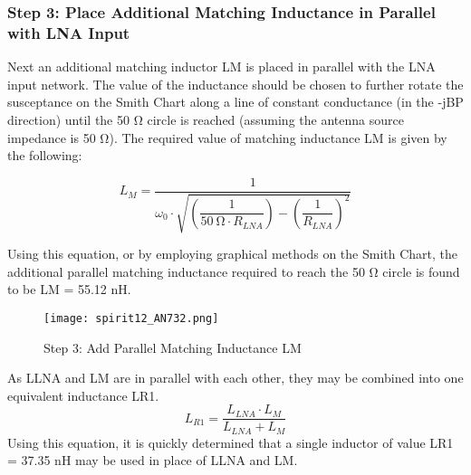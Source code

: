       \subsubsection{Step 3: Place Additional Matching Inductance in Parallel with LNA Input}
        Next an additional matching inductor LM is placed in parallel with the LNA input network. 
        The value of the inductance should be chosen to further rotate the susceptance on the Smith 
        Chart along a line of constant conductance (in the -jBP direction) until the 50 Ω circle is 
        reached (assuming the antenna source impedance is 50 Ω). The required value of matching 
        inductance LM is given by the following:
        
        \begin{equation}\label{EXP001:eq_spirit13}
          L_M = \frac{1}{\omega_0\cdot\sqrt{\left(\dfrac{1}{\SI{50}{\ohm}\cdot R_{LNA}}\right) - 
                         \left(\dfrac{1}{R_{LNA}}\right)^2}}
        \end{equation}
        
        Using this equation, or by employing graphical methods on the Smith Chart, the additional 
        parallel matching inductance required to reach the 50 Ω circle is found to be LM = 55.12 nH.

        \begin{figure}[ht!] %
          \centering
          \texttt{[image: spirit12\_AN732.png]}
          \caption{Step 3: Add Parallel Matching Inductance LM \cite[s.~7]{AN643SiliconLabs}}
          \label{EXP001:fig_spirit12}
        \end{figure}
        
        As LLNA and LM are in parallel with each other, they may be combined into one equivalent 
        inductance LR1.
        \begin{equation}\label{EXP001:eq_spirit14}
          L_{R1} = \frac{L_{LNA}\cdot L_M}{L_{LNA} + L_M}
        \end{equation}
        Using this equation, it is quickly determined that a single inductor of value LR1 = 37.35 
        nH may be used in place of LLNA and LM.
        
